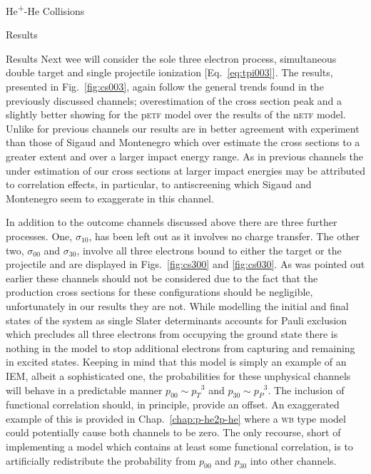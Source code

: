 \documentclass[letterpaper, 11 pt]{report}
\begin{document}
\begin{chapter}{\texorpdfstring{He\textsuperscript{+}}{He+}-He Collisions \label{chap:hephe}}
\begin{section}{Results \label{sec:hephe-disc}}
\begin{subsection}{Results \label{sec:hephe-res}}
         Next wee will consider the sole three electron process, simultaneous double target and single
         projectile ionization [Eq.~\eqref{eq:tpi003}]. The results, presented in Fig.~\ref{fig:cs003},
         again follow the general trends found in the previously discussed channels; overestimation of
         the cross section peak and a slightly better showing for the p\textsc{etf} model over the
         results of the n\textsc{etf} model. Unlike for previous channels our results are in better
         agreement with experiment than those of Sigaud and Montenegro which over estimate the cross
         sections to a greater extent and over a larger impact energy range. As in previous channels the
         under estimation of our cross sections at larger impact energies may be attributed to
         correlation effects, in particular, to antiscreening which  Sigaud and Montenegro seem to
         exaggerate in this channel.

         In addition to the outcome channels discussed above there are three further processes. One,
         $\sigma_{10}$, has been left out as it involves no charge transfer. The other two,
         $\sigma_{00}$ and $\sigma_{30}$, involve all three electrons bound to either the target or the
         projectile and are displayed in Figs.~\ref{fig:cs300} and \ref{fig:cs030}. As was pointed out
         earlier these channels should not be considered due to the fact that the production cross
         sections for these configurations should be negligible, unfortunately in our results they are
         not. While modelling the initial and final states of the system as single Slater determinants
         accounts for Pauli exclusion which precludes all three electrons from occupying the ground
         state there is nothing in the model to stop additional electrons from capturing and remaining
         in excited states. Keeping in mind that this model is simply an example of an \textsc{IEM},
         albeit a sophisticated one, the probabilities for these unphysical channels will behave in a
         predictable manner $p_{00} \sim {p_T}^3$ and $p_{30} \sim {p_P}^3$. The inclusion of functional
         correlation should, in principle, provide an offset. An exaggerated example of this is
         provided in Chap.~\ref{chap:p-he2p-he} where a \textsc{wb} type model could potentially cause
         both channels to be zero. The only recourse, short of implementing a model which contains at
         least some functional correlation, is to artificially redistribute the probability from
         $p_{00}$ and $p_{30}$ into other channels.


\end{subsection}
\end{section}
\end{chapter}
\end{document}
